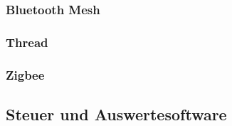 \subsubsection{Bluetooth Mesh}\label{subsubsection:Bluetooth Mesh}

\subsubsection{Thread}\label{subsubsection:Thread} 

\subsubsection{Zigbee}\label{subsubsection:Zigbee}


\subsection{Steuer und Auswertesoftware}\label{subsec:SteuerundAuswertesoftware}

